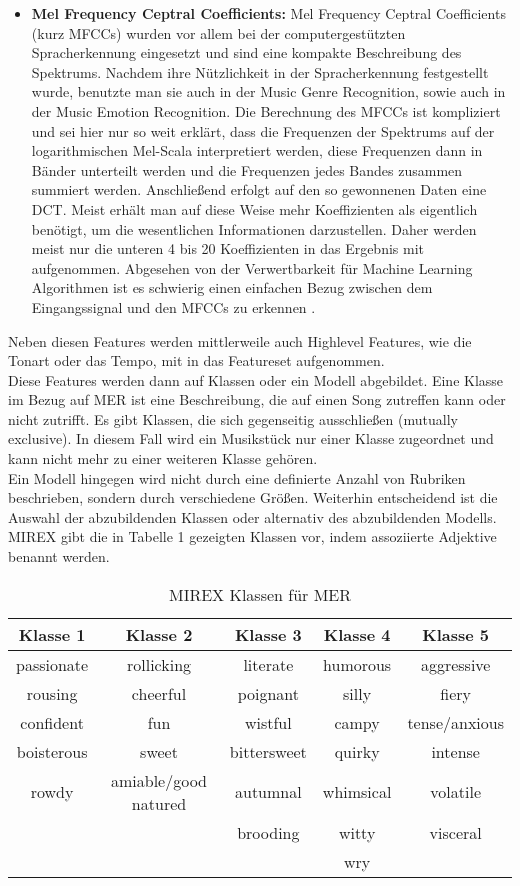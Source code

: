 \documentclass[11pt,a4paper]{article}
\begin{document}
\begin{itemize}
\item \textbf{Mel Frequency Ceptral Coefficients:} Mel Frequency Ceptral Coefficients (kurz MFCCs) wurden vor allem bei der computergestützten Spracherkennung eingesetzt und sind eine kompakte Beschreibung des Spektrums. Nachdem ihre Nützlichkeit in der Spracherkennung festgestellt wurde, benutzte man sie auch in der Music Genre Recognition, sowie auch in der Music Emotion Recognition. Die Berechnung des MFCCs ist kompliziert und sei hier nur so weit erklärt, dass die Frequenzen der Spektrums auf der logarithmischen Mel-Scala interpretiert werden, diese Frequenzen dann in Bänder unterteilt werden und die Frequenzen jedes Bandes zusammen summiert werden. Anschließend erfolgt auf den so gewonnenen Daten eine DCT. Meist erhält man auf diese Weise mehr Koeffizienten als eigentlich benötigt, um die wesentlichen Informationen darzustellen. Daher werden meist nur die unteren 4 bis 20 Koeffizienten in das Ergebnis mit aufgenommen. Abgesehen von der Verwertbarkeit für Machine Learning Algorithmen ist es schwierig einen einfachen Bezug zwischen dem Eingangssignal und den MFCCs zu erkennen \cite[S. 41 ff.]{lerch2012introduction}.
\end{itemize}
Neben diesen Features werden mittlerweile auch Highlevel Features, wie die Tonart oder das Tempo, mit in das Featureset aufgenommen.\\
Diese Features werden dann auf Klassen oder ein Modell abgebildet. Eine Klasse im Bezug auf MER ist eine Beschreibung, die auf einen Song zutreffen kann oder nicht zutrifft. Es gibt Klassen, die sich gegenseitig ausschließen (mutually exclusive). In diesem Fall wird ein Musikstück nur einer Klasse zugeordnet und kann nicht mehr zu einer weiteren Klasse gehören.\\
Ein Modell hingegen wird nicht durch eine definierte Anzahl von Rubriken beschrieben, sondern durch verschiedene Größen.
Weiterhin entscheidend ist die Auswahl der abzubildenden Klassen oder alternativ des abzubildenden Modells.\\
MIREX gibt die in Tabelle 1 gezeigten Klassen vor, indem assoziierte Adjektive benannt werden.
\begin{center}
\begin{table}[h]
\begin{tabular}{c c c c c}
\textbf{Klasse 1} & \textbf{Klasse 2} & \textbf{Klasse 3} & \textbf{Klasse 4} & \textbf{Klasse 5} \\
\hline
passionate & rollicking & literate & humorous & aggressive \\
rousing & cheerful & poignant & silly & fiery \\
confident & fun & wistful & campy & tense/anxious \\
boisterous & sweet & bittersweet & quirky & intense \\
rowdy & amiable/good natured & autumnal & whimsical & volatile \\
 & & brooding & witty & visceral \\
  & & & wry &
\end{tabular}
\caption[MIREX Music Emotion Recognition Klassen]{MIREX Klassen für MER}
\end{table}
\end{center}
\end{document}
